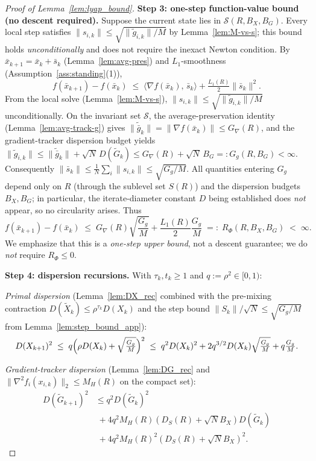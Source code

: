 \documentclass[11pt,a4paper]{article}
\begin{document}
\begin{proof}[Proof of Lemma~\ref{lem:lyap_bound}]
\smallskip
\noindent\textbf{Step 3: one-step function-value bound (no descent required).}
Suppose the current state lies in $\mathcal S(R,B_X,B_G)$.
Every local step satisfies $\|s_{i,k}\|\le\sqrt{\|\tilde g_{i,k}\|/M}$
by Lemma~\ref{lem:M-vs-s}; this bound holds \emph{unconditionally}
and does not require the inexact Newton condition.
By $\bar x_{k+1}=\bar x_k+\bar s_k$ (Lemma~\ref{lem:avg-pres}) and
$L_1$-smoothness (Assumption~\ref{ass:standing}(1)),
\[
  f(\bar x_{k+1})-f(\bar x_k)
  \;\le\;
  \langle \nabla f(\bar x_k),\,\bar s_k\rangle
  +\tfrac{L_1(R)}{2}\|\bar s_k\|^2.
\]
From the local solve (Lemma~\ref{lem:M-vs-s}),
$\|s_{i,k}\|\le\sqrt{\|\tilde g_{i,k}\|/M}$ unconditionally.
On the invariant set $\mathcal S$, the average-preservation identity
(Lemma~\ref{lem:avg-track-g}) gives
$\|\tilde{\bar g}_k\|=\|\nabla f(\bar x_k)\|\le G_\nabla(R)$,
and the gradient-tracker dispersion budget yields
$\|\tilde g_{i,k}\|\le \|\tilde{\bar g}_k\|+\sqrt{N}\,D(\tilde G_k)
\le G_\nabla(R)+\sqrt{N}\,B_G=:G_g(R,B_G)<\infty$.
Consequently $\|\bar s_k\|\le\frac{1}{N}\sum_i\|s_{i,k}\|
\le\sqrt{G_g/M}$.
All quantities entering $G_g$ depend only on $R$ (through the
sublevel set $S(R)$) and the dispersion budgets $B_X,B_G$;
in particular, the iterate-diameter constant $D$ being established
does \emph{not} appear, so no circularity arises.
Thus
\begin{equation}\label{eq:rphi_R}
  f(\bar x_{k+1})-f(\bar x_k)
  \;\le\;
  G_\nabla(R)\sqrt{\frac{G_g}{M}}+\frac{L_1(R)}{2}\frac{G_g}{M}
  \;=:\; R_\Phi(R,B_X,B_G) \;<\;\infty.
\end{equation}
We emphasize that this is a \emph{one-step upper bound}, not a descent
guarantee; we do \emph{not} require $R_\Phi\le 0$.

\smallskip
\noindent\textbf{Step 4: dispersion recursions.}
With $\tau_k,t_k\ge1$ and $q:=\rho^2\in[0,1)$:

\emph{Primal dispersion} (Lemma~\ref{lem:DX_rec} combined with the
pre-mixing contraction $D(\tilde X_k)\le \rho^{\tau_k}D(X_k)$ and the
step bound $\|S_k\|/\sqrt{N}\le \sqrt{G_g/M}$ from
Lemma~\ref{lem:step_bound_app}):
\[
  D(X_{k+1})^2
  \;\le\; q\Bigl(\rho D(X_k)+\sqrt{\tfrac{G_g}{M}}\Bigr)^2
  \;\le\; q^2 D(X_k)^2 + 2q^{3/2}D(X_k)\sqrt{\tfrac{G_g}{M}}+q\tfrac{G_g}{M}.
\]

\emph{Gradient-tracker dispersion} (Lemma~\ref{lem:DG_rec}
and $\|\nabla^2 f_i(x_{i,k})\|_2\le M_H(R)$ on the compact set):
\begin{align*}
  D(\tilde G_{k+1})^2
  &\le q^2 D(\tilde G_k)^2\\
  &\;+ 4q^2 M_H(R)(D_S(R){+}\sqrt{N}B_X)D(\tilde G_k)\\
  &\;+ 4q^2 M_H(R)^2(D_S(R){+}\sqrt{N}B_X)^2.
\end{align*}


\end{proof}
\end{document}
